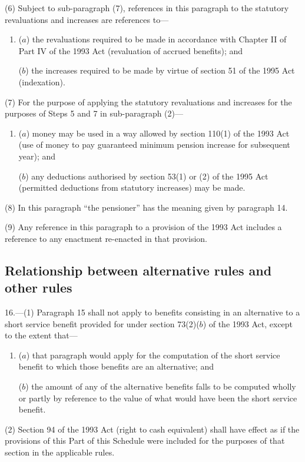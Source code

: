 \documentclass[12pt,a4paper]{article}
\begin{document}
(6) Subject to sub-paragraph (7), references in this paragraph to the statutory revaluations and increases are references to—
\begin{enumerate}\item[]
($a$) the revaluations required to be made in accordance with Chapter II of Part IV of the 1993 Act (revaluation of accrued benefits); and

($b$) the increases required to be made by virtue of section 51 of the 1995 Act (indexation).
\end{enumerate}

(7) For the purpose of applying the statutory revaluations and increases for the purposes of Steps 5 and 7 in sub-paragraph (2)—
\begin{enumerate}\item[]
($a$) money may be used in a way allowed by section 110(1)  of the 1993 Act (use of money to pay guaranteed minimum pension increase for subsequent year); and

($b$) any deductions authorised by section 53(1)  or (2)  of the 1995 Act (permitted deductions from statutory increases) may be made.
\end{enumerate}

(8) In this paragraph “the pensioner” has the meaning given by paragraph 14. 

(9) Any reference in this paragraph to a provision of the 1993 Act includes a reference to any enactment re-enacted in that provision.

\subsection*{Relationship between alternative rules and other rules}

16.---(1) Paragraph 15 shall not apply to benefits consisting in an alternative to a short service benefit provided for under section 73(2)($b$)  of the 1993 Act, except to the extent that—
\begin{enumerate}\item[]
($a$) that paragraph would apply for the computation of the short service benefit to which those benefits are an alternative; and

($b$) the amount of any of the alternative benefits falls to be computed wholly or partly by reference to the value of what would have been the short service benefit.
\end{enumerate}

(2) Section 94 of the 1993 Act (right to cash equivalent) shall have effect as if the provisions of this Part of this Schedule were included for the purposes of that section in the applicable rules.
\end{document}
